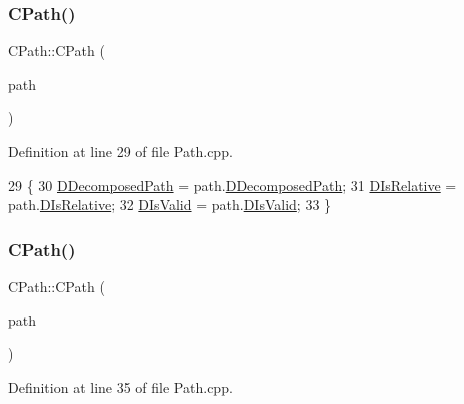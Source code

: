 \subsubsection{\texorpdfstring{C\+Path()}{CPath()}\hspace{0.1cm}{\footnotesize\ttfamily [2/3]}}
{\footnotesize\ttfamily C\+Path\+::\+C\+Path (\begin{DoxyParamCaption}\item[{const \hyperlink{classCPath}{C\+Path} \&}]{path }\end{DoxyParamCaption})}



Definition at line 29 of file Path.\+cpp.


\begin{DoxyCode}
29                              \{
30     \hyperlink{classCPath_a03ed25209a01e633c107a0c877fc61f8}{DDecomposedPath} = path.\hyperlink{classCPath_a03ed25209a01e633c107a0c877fc61f8}{DDecomposedPath};
31     \hyperlink{classCPath_af705ff149bb2281c67afb84fff550eb9}{DIsRelative} = path.\hyperlink{classCPath_af705ff149bb2281c67afb84fff550eb9}{DIsRelative};
32     \hyperlink{classCPath_a992aca27a1cba1c3bae3d04438821192}{DIsValid} = path.\hyperlink{classCPath_a992aca27a1cba1c3bae3d04438821192}{DIsValid};
33 \}
\end{DoxyCode}
\hypertarget{classCPath_aceb476f21440713272cf0ef38f2619c6}{}\label{classCPath_aceb476f21440713272cf0ef38f2619c6} 
\subsubsection{\texorpdfstring{C\+Path()}{CPath()}\hspace{0.1cm}{\footnotesize\ttfamily [3/3]}}
{\footnotesize\ttfamily C\+Path\+::\+C\+Path (\begin{DoxyParamCaption}\item[{const std\+::string \&}]{path }\end{DoxyParamCaption})}



Definition at line 35 of file Path.\+cpp.


